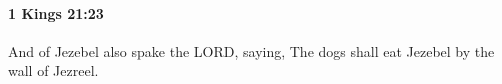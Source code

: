 
		\paragraph{1 Kings 21:23} %
			\label{1KINGS-21-23}

			And of Jezebel also spake the LORD, saying, The dogs shall eat Jezebel by the wall of Jezreel.


